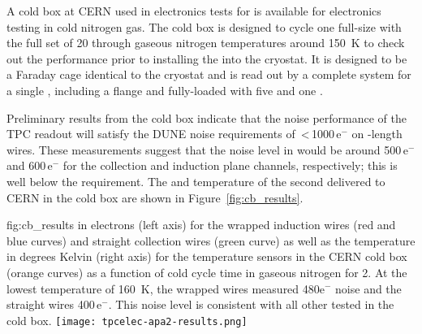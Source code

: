 A cold box at CERN used in electronics tests for  is available for electronics testing in cold nitrogen gas. The cold box is designed to cycle one full-size  with the full set of \num{20}  through gaseous nitrogen temperatures around \SI{150}{K} to check out the  performance prior to installing the  into the  cryostat. It is designed to be a Faraday cage identical to the  cryostat and is read out by a complete  system for a single , including a  flange and fully-loaded  with five  and one .

Preliminary results from the  cold box indicate that
the noise performance of the TPC readout will satisfy the DUNE  noise requirements of
\,<\,\num{1000}\,e$^-$ on -length wires. These measurements suggest that the noise level in
\lar would be around \num{500}\,e$^-$ and \num{600}\,e$^-$ for the collection and induction plane channels,
respectively; this is well below the requirement.  The  and temperature of the second 
 delivered to CERN in the cold box are shown in Figure~\ref{fig:cb_results}.

\begin{dunefigure}
{fig:cb_results}
{ in electrons (left axis) for the wrapped induction wires (red and blue curves) and 
straight collection wires (green curve) as well as the temperature in degrees Kelvin (right axis) for the temperature
sensors in the CERN cold box (orange curves) as a function of cold cycle time in gaseous nitrogen for  2. 
At the lowest temperature of \SI{160}{K}, the wrapped wires measured 480e$^-$ noise and the straight 
wires \num{400}\,e$^-$. This noise level is consistent with all other   tested in the cold box.}
\texttt{[image: tpcelec-apa2-results.png]}
\end{dunefigure}
